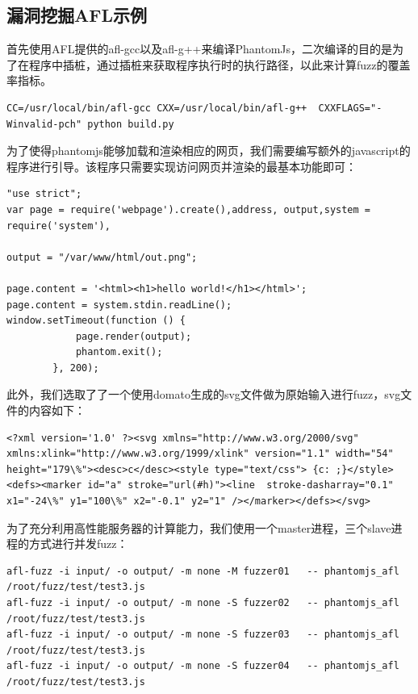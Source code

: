 \documentclass[doctor,privacy,twoside]{buaa_mac}
\begin{document}
\subsection{漏洞挖掘AFL示例}
首先使用AFL提供的afl-gcc以及afl-g++来编译PhantomJs，二次编译的目的是为了在程序中插桩，通过插桩来获取程序执行时的执行路径，以此来计算fuzz的覆盖率指标。

\lstset{language=JavaScript}
\begin{lstlisting}
CC=/usr/local/bin/afl-gcc CXX=/usr/local/bin/afl-g++  CXXFLAGS="-Winvalid-pch" python build.py
\end{lstlisting}

为了使得phantomjs能够加载和渲染相应的网页，我们需要编写额外的javascript的程序进行引导。该程序只需要实现访问网页并渲染的最基本功能即可：

\lstset{language=JavaScript}
\begin{lstlisting}
"use strict";
var page = require('webpage').create(),address, output,system = require('system'),

output = "/var/www/html/out.png";

page.content = '<html><h1>hello world!</h1></html>';
page.content = system.stdin.readLine();
window.setTimeout(function () {
            page.render(output);
            phantom.exit();
        }, 200);
\end{lstlisting}

此外，我们选取了了一个使用domato生成的svg文件做为原始输入进行fuzz，svg文件的内容如下：
\lstset{language=JavaScript}
\begin{lstlisting}
<?xml version='1.0' ?><svg xmlns="http://www.w3.org/2000/svg" xmlns:xlink="http://www.w3.org/1999/xlink" version="1.1" width="54" height="179\%"><desc>c</desc><style type="text/css"> {c: ;}</style><defs><marker id="a" stroke="url(#h)"><line  stroke-dasharray="0.1" x1="-24\%" y1="100\%" x2="-0.1" y2="1" /></marker></defs></svg>
\end{lstlisting}

为了充分利用高性能服务器的计算能力，我们使用一个master进程，三个slave进程的方式进行并发fuzz：

\lstset{language=JavaScript}
\begin{lstlisting}
afl-fuzz -i input/ -o output/ -m none -M fuzzer01   -- phantomjs_afl /root/fuzz/test/test3.js
afl-fuzz -i input/ -o output/ -m none -S fuzzer02   -- phantomjs_afl /root/fuzz/test/test3.js
afl-fuzz -i input/ -o output/ -m none -S fuzzer03   -- phantomjs_afl /root/fuzz/test/test3.js
afl-fuzz -i input/ -o output/ -m none -S fuzzer04   -- phantomjs_afl /root/fuzz/test/test3.js
\end{lstlisting}
\end{document}
